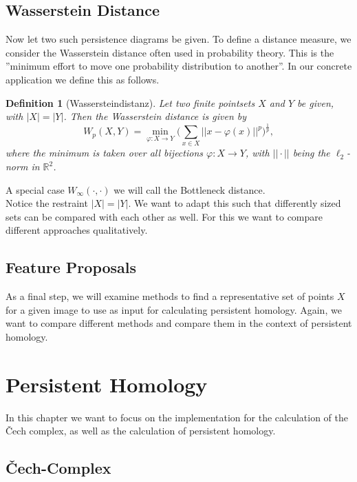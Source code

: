 \documentclass[11pt, a4paper,draft]{report}
\newtheorem{definition}{Definition}
\newcommand{\bR}{\mathbb{R}}
\begin{document}
	\section{Wasserstein Distance}
	
	Now let two such persistence diagrams be given. To define a distance measure, we consider the Wasserstein distance often used in probability theory. This is the ''minimum effort to move one probability distribution to another''. In our concrete application we define this as follows.
	
	\begin{definition}[Wassersteindistanz]
		Let two finite pointsets $X$ and $Y$ be given, with $|X|=|Y|$. Then the Wasserstein distance is given by$$W_p(X,Y) = \min_{\varphi:X\rightarrow Y}\bigg(\sum_{x\in X}||x-\varphi(x)||^p\bigg)^{\frac{1}{p}},$$
		where the minimum is taken over all bijections $\varphi:X\rightarrow Y$, with $||\cdot||$ being the $\ell_2$-norm in $\bR^2$.
	\end{definition}

	A special case $W_\infty(\cdot,\cdot)$ we will call the Bottleneck distance.\\
Notice the restraint $|X| = |Y|$. We want to adapt this such that differently sized sets can be compared with each other as well. For this we want to compare different approaches qualitatively.
	
	\section{Feature Proposals}
	
	As a final step, we will examine methods to find a representative set of points $X$ for a given image to use as input for calculating persistent homology. Again, we want to compare different methods and compare them in the context of persistent homology.
	\chapter{Persistent Homology}
	
	In this chapter we want to focus on the implementation for the calculation of the Čech complex, as well as the calculation of persistent homology.
	
	\section{Čech-Complex}
	
\end{document}
